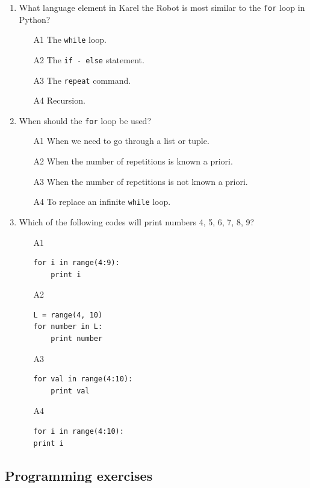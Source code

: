 \begin{enumerate}
\item What language element in Karel the Robot is most similar to the {\tt for} loop in Python?
\begin{enumerate}
\item[A1] The {\tt while} loop.
\item[A2] The {\tt if - else} statement.
\item[A3] The {\tt repeat} command.
\item[A4] Recursion.
\end{enumerate}
\item When should the {\tt for} loop be used?
\begin{enumerate}
\item[A1] When we need to go through a list or tuple.
\item[A2] When the number of repetitions is known a priori. 
\item[A3] When the number of repetitions is not known a priori. 
\item[A4] To replace an infinite {\tt while} loop.
\end{enumerate}
\item Which of the following codes will print numbers 4, 5, 6, 7, 8, 9?
\begin{enumerate}
\item[A1] 
\begin{verbatim}
for i in range(4:9):
    print i
\end{verbatim}
\item[A2] 
\begin{verbatim}
L = range(4, 10)
for number in L:
    print number
\end{verbatim}
\item[A3] 
\begin{verbatim}
for val in range(4:10):
    print val
\end{verbatim}
\item[A4] 
\begin{verbatim}
for i in range(4:10):
print i
\end{verbatim}
\end{enumerate}
\end{enumerate}

\subsection{Programming exercises}

